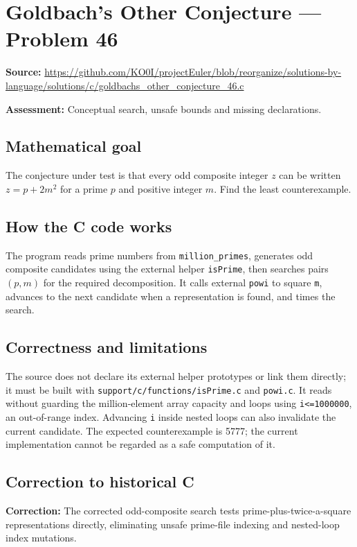 \section{Goldbach's Other Conjecture --- Problem 46}
\label{prob:46}
\noindent\textbf{Source:} \url{https://github.com/KO0I/projectEuler/blob/reorganize/solutions-by-language/solutions/c/goldbachs_other_conjecture_46.c}

\noindent\textbf{Assessment:} Conceptual search, unsafe bounds and missing declarations.

\subsection*{Mathematical goal}
The conjecture under test is that every odd composite integer \(z\) can be written \(z=p+2m^2\) for a prime \(p\) and positive integer \(m\). Find the least counterexample.

\subsection*{How the C code works}
The program reads prime numbers from \verb|million_primes|, generates odd composite candidates using the external helper \verb|isPrime|, then searches pairs \((p,m)\) for the required decomposition. It calls external \verb|powi| to square \verb|m|, advances to the next candidate when a representation is found, and times the search.

\subsection*{Correctness and limitations}
The source does not declare its external helper prototypes or link them directly; it must be built with \verb|support/c/functions/isPrime.c| and \verb|powi.c|. It reads without guarding the million-element array capacity and loops using \verb|i<=1000000|, an out-of-range index. Advancing \verb|i| inside nested loops can also invalidate the current candidate. The expected counterexample is 5777; the current implementation cannot be regarded as a safe computation of it.


\subsection*{Correction to historical C}
{\color{red}\textbf{Correction:} The corrected odd-composite search tests prime-plus-twice-a-square representations directly, eliminating unsafe prime-file indexing and nested-loop index mutations.}

